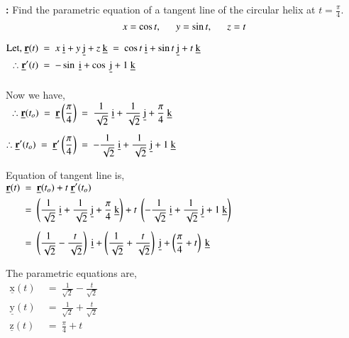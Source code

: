 \documentclass[12pt]{article}
\renewcommand{\vec}[1]{\underline{\mathrm{#1}}}
\renewcommand{\r}{\mathrm{\textbf{r}}}
\newcommand{\vf}[2][t]{\vec{#2}(#1)}
\begin{document}
\textbf{:} Find the parametric equation of a tangent line of the circular helix at $t=\frac{\pi}{4}$.
\vspace{-\baselineskip}
$$x=\cos{t}, \ \ \ \ \ \  y=\sin{t}, \ \ \ \ \ \  z=t$$

\vspace{-\baselineskip}

\vspace{1ex}
$\begin{aligned}
   \text{Let,\ } \vf{\r} \ & = \ \vecf \ = \ \vecf[\cos{t}][\sin{t}][t]\\
   \therefore \dt{\r} \ & = \ \vecf[-\sin][\cos][1]\\[1ex]
\end{aligned}$

\vspace{1ex}
Now we have,\\[1ex]
$\begin{aligned}
   \therefore \vf[t_o]{\r} \ = \ \vec{\r}\left(\frac{\pi}{4}\right) & \ = \ \vecf[\frac{1}{\sqrt{2}}][\frac{1}{\sqrt{2}}][\frac{\pi}{4}]\\[1ex]
   \therefore \dt[t_o]{\r} \ = \ \vec{\r}^\prime\left(\frac{\pi}{4}\right) & \ = \ -\vecf[\frac{1}{\sqrt{2}}][\frac{1}{\sqrt{2}}][1]\\
\end{aligned}$

\vspace{3ex}
Equation of tangent line is,\\
$\begin{aligned}
   \vf{\r} & \ = \ \vec{\r}(t_o) + t\ \dt[t_o]{\r}\\
   & \ = \ \left(\vecf[\frac{1}{\sqrt{2}}][\frac{1}{\sqrt{2}}][\frac{\pi}{4}]\right) + t\ \left(-\vecf[\frac{1}{\sqrt{2}}][\frac{1}{\sqrt{2}}][1]\right)\\[1ex]
   & \ = \ \vecf[\left(\frac{1}{\sqrt{2}}-\frac{t}{\sqrt{2}}\right)][\left(\frac{1}{\sqrt{2}}+\frac{t}{\sqrt{2}}\right)][\left(\frac{\pi}{4}+t\right)]
\end{aligned}$

\vspace{3ex}
The parametric equations are,\\[1ex]
$\begin{aligned}
   \vf{x} \ &= \ \frac{1}{\sqrt{2}}-\frac{t}{\sqrt{2}}\\[1ex]
   \vf{y} \ &= \ \frac{1}{\sqrt{2}}+\frac{t}{\sqrt{2}}\\[1ex]
   \vf{z} \ &= \ \frac{\pi}{4}+t
\end{aligned}$
\end{document}
